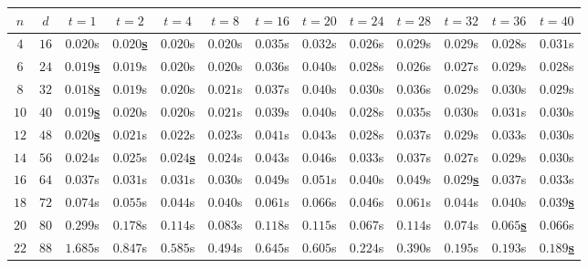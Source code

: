 \begin{table}[ht]
    \centering
    \begin{adjustwidth}{-1.2cm}{-1.2cm}
    {\renewcommand{\arraystretch}{1.05}
        \setlength{\tabcolsep}{2.5pt}
        \small
        \begin{tabular}{ccccccccccccc}
            $n$ & $d$ & $t = 1$ & $t = 2$ & $t = 4$ & $t = 8$ & $t = 16$ & $t = 20$ & $t = 24$ & $t = 28$ & $t = 32$ & $t = 36$ & $t = 40$ \\
            \hline
            $4$ & $16$ & $0.020$s & \underline{$\mathbf{0.020}$\textbf{s}} & $0.020$s & $0.020$s & $0.035$s & $0.032$s & $0.026$s & $0.029$s & $0.029$s & $0.028$s & $0.031$s \\
            $6$ & $24$ & \underline{$\mathbf{0.019}$\textbf{s}} & $0.019$s & $0.020$s & $0.020$s & $0.036$s & $0.040$s & $0.028$s & $0.026$s & $0.027$s & $0.029$s & $0.028$s \\
            $8$ & $32$ & \underline{$\mathbf{0.018}$\textbf{s}} & $0.019$s & $0.020$s & $0.021$s & $0.037$s & $0.040$s & $0.030$s & $0.036$s & $0.029$s & $0.030$s & $0.029$s \\
            $10$ & $40$ & \underline{$\mathbf{0.019}$\textbf{s}} & $0.020$s & $0.020$s & $0.021$s & $0.039$s & $0.040$s & $0.028$s & $0.035$s & $0.030$s & $0.031$s & $0.030$s \\
            $12$ & $48$ & \underline{$\mathbf{0.020}$\textbf{s}} & $0.021$s & $0.022$s & $0.023$s & $0.041$s & $0.043$s & $0.028$s & $0.037$s & $0.029$s & $0.033$s & $0.030$s \\
            $14$ & $56$ & $0.024$s & $0.025$s & \underline{$\mathbf{0.024}$\textbf{s}} & $0.024$s & $0.043$s & $0.046$s & $0.033$s & $0.037$s & $0.027$s & $0.029$s & $0.030$s \\
            $16$ & $64$ & $0.037$s & $0.031$s & $0.031$s & $0.030$s & $0.049$s & $0.051$s & $0.040$s & $0.049$s & \underline{$\mathbf{0.029}$\textbf{s}} & $0.037$s & $0.033$s \\
            $18$ & $72$ & $0.074$s & $0.055$s & $0.044$s & $0.040$s & $0.061$s & $0.066$s & $0.046$s & $0.061$s & $0.044$s & $0.040$s & \underline{$\mathbf{0.039}$\textbf{s}} \\
            $20$ & $80$ & $0.299$s & $0.178$s & $0.114$s & $0.083$s & $0.118$s & $0.115$s & $0.067$s & $0.114$s & $0.074$s & \underline{$\mathbf{0.065}$\textbf{s}} & $0.066$s \\
            $22$ & $88$ & $1.685$s & $0.847$s & $0.585$s & $0.494$s & $0.645$s & $0.605$s & $0.224$s & $0.390$s & $0.195$s & $0.193$s & \underline{$\mathbf{0.189}$\textbf{s}} \\

\end{tabular}}
\end{adjustwidth}
\end{table}
